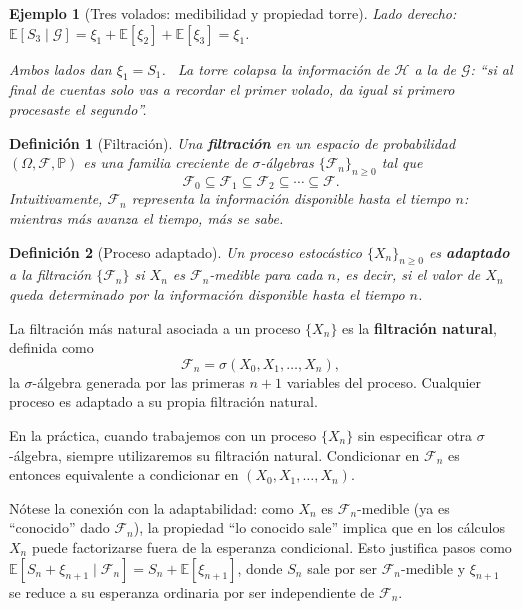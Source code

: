 \documentclass[12pt]{book}
\newtheorem{definition}{Definición}[chapter]
\newtheorem{example}{Ejemplo}[chapter]
\begin{document}
\begin{example}[Tres volados: medibilidad y propiedad torre]
    Lado derecho: $\mathbb{E}[S_3 \mid \mathcal{G}] = \xi_1 + \mathbb{E}[\xi_2] + \mathbb{E}[\xi_3] = \xi_1$.

    Ambos lados dan $\xi_1 = S_1$. \checkmark \ La torre colapsa la información de $\mathcal{H}$ a la de $\mathcal{G}$: ``si al final de cuentas solo vas a recordar el primer volado, da igual si primero procesaste el segundo''.
\end{example}

\begin{definition}[Filtración]
    Una \textbf{filtración} en un espacio de probabilidad $(\Omega, \mathcal{F}, \mathbb{P})$ es una familia creciente de $\sigma$-álgebras $\{\mathcal{F}_n\}_{n \ge 0}$ tal que
    \[
        \mathcal{F}_0 \subseteq \mathcal{F}_1 \subseteq \mathcal{F}_2 \subseteq \cdots \subseteq \mathcal{F}.
    \]
    Intuitivamente, $\mathcal{F}_n$ representa \emph{la información disponible hasta el tiempo $n$}: mientras más avanza el tiempo, más se sabe.
\end{definition}

\begin{definition}[Proceso adaptado]
    Un proceso estocástico $\{X_n\}_{n \ge 0}$ es \textbf{adaptado} a la filtración $\{\mathcal{F}_n\}$ si $X_n$ es $\mathcal{F}_n$-medible para cada $n$, es decir, si el valor de $X_n$ queda determinado por la información disponible hasta el tiempo $n$.
\end{definition}

La filtración más natural asociada a un proceso $\{X_n\}$ es la \textbf{filtración natural}, definida como
\[
    \mathcal{F}_n = \sigma(X_0, X_1, \ldots, X_n),
\]
la $\sigma$-álgebra generada por las primeras $n+1$ variables del proceso. Cualquier proceso es adaptado a su propia filtración natural.

En la práctica, cuando trabajemos con un proceso $\{X_n\}$ sin especificar otra $\sigma$-álgebra, siempre utilizaremos su filtración natural. Condicionar en $\mathcal{F}_n$ es entonces equivalente a condicionar en $(X_0, X_1, \ldots, X_n)$.

Nótese la conexión con la adaptabilidad: como $X_n$ es $\mathcal{F}_n$-medible (ya es ``conocido'' dado $\mathcal{F}_n$), la propiedad ``lo conocido sale'' implica que en los cálculos $X_n$ puede factorizarse fuera de la esperanza condicional. Esto justifica pasos como $\mathbb{E}[S_n + \xi_{n+1} \mid \mathcal{F}_n] = S_n + \mathbb{E}[\xi_{n+1}]$, donde $S_n$ sale por ser $\mathcal{F}_n$-medible y $\xi_{n+1}$ se reduce a su esperanza ordinaria por ser independiente de $\mathcal{F}_n$.
\end{document}
